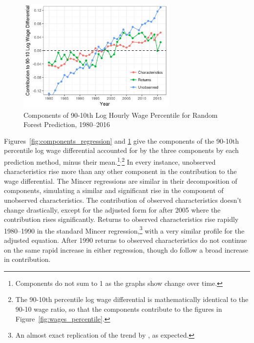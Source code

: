 \documentclass[notitlepage,12pt]{article}
\newcommand{\1}[1]{\ensuremath{\mathbb{1}\left( #1 \right)}}               %
\begin{document}
\begin{figure}[htb!]
  \centering
  \includegraphics[width=0.7\textwidth]{figures/edit3.png}
  \caption{Components of 90-10th Log Hourly Wage Percentile for Random Forest Prediction, 1980--2016}
  \label{fig:components_randomforest}
\end{figure}

Figures~\ref{fig:components_regression} and \ref{fig:components_randomforest} give the components of the 90-10th percentile log wage differential accounted for by the three components by each prediction method, minus their mean.\footnote{Components do not sum to 1 as the graphs show change over time.}$^{,}$\footnote{The 90-10th percentile log wage differential is mathematically identical to the 90-10 wage ratio, so that the components contribute to the figures in Figure~\ref{fig:wages_percentile}.}  In every instance, unobserved characteristics rise more than any other component in the contribution to the wage differential.  The Mincer regressions are similar in their decomposition of components, simulating a similar and significant rise in the component of unobserved characteristics.  The contribution of observed characteristics doesn't change drastically, except for the adjusted form for after 2005 where the contribution rises significantly.  Returns to observed characteristics rise rapidly 1980--1990 in the standard Mincer regression,\footnote{An almost exact replication of the trend by \cite{juhn1993wage}, as expected.} with a very similar profile for the adjusted equation.  After 1990 returns to observed characteristics do not continue on the same rapid increase in either regression, though do follow a broad increase in contribution.
\end{document}
